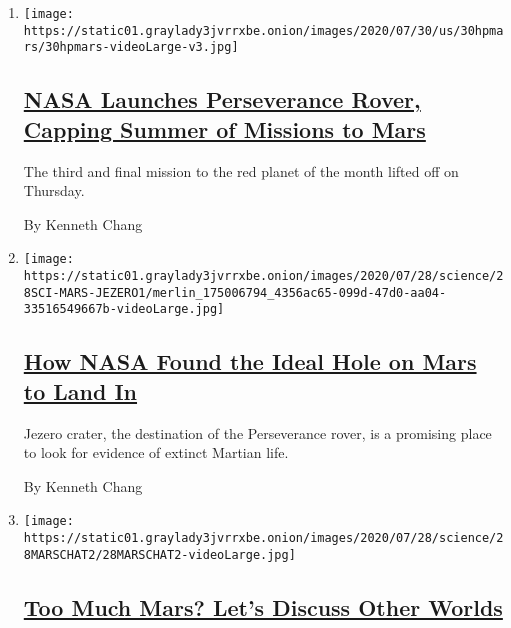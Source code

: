 \begin{enumerate}
\def\labelenumi{\arabic{enumi}.}
\item
  \texttt{[image: https://static01.graylady3jvrrxbe.onion/images/2020/07/30/us/30hpmars/30hpmars-videoLarge-v3.jpg]}

  \hypertarget{nasa-launches-perseverance-rover-capping-summer-of-missions-to-mars}{%
  \subsection{\texorpdfstring{\href{/2020/07/30/science/nasa-mars-launch.html}{NASA
  Launches Perseverance Rover, Capping Summer of Missions to
  Mars}}{NASA Launches Perseverance Rover, Capping Summer of Missions to Mars}}\label{nasa-launches-perseverance-rover-capping-summer-of-missions-to-mars}}

  The third and final mission to the red planet of the month lifted off
  on Thursday.

  By Kenneth Chang
\item
  \texttt{[image: https://static01.graylady3jvrrxbe.onion/images/2020/07/28/science/28SCI-MARS-JEZERO1/merlin\_175006794\_4356ac65-099d-47d0-aa04-33516549667b-videoLarge.jpg]}

  \hypertarget{how-nasa-found-the-ideal-hole-on-mars-to-land-in}{%
  \subsection{\texorpdfstring{\href{/2020/07/28/science/nasa-jezero-perseverance.html}{How
  NASA Found the Ideal Hole on Mars to Land
  In}}{How NASA Found the Ideal Hole on Mars to Land In}}\label{how-nasa-found-the-ideal-hole-on-mars-to-land-in}}

  Jezero crater, the destination of the Perseverance rover, is a
  promising place to look for evidence of extinct Martian life.

  By Kenneth Chang
\item
  \texttt{[image: https://static01.graylady3jvrrxbe.onion/images/2020/07/28/science/28MARSCHAT2/28MARSCHAT2-videoLarge.jpg]}

  \hypertarget{too-much-mars-lets-discuss-other-worlds}{%
  \subsection{\texorpdfstring{\href{/2020/07/28/science/mars-nasa-science.html}{Too
  Much Mars? Let's Discuss Other
  Worlds}}{Too Much Mars? Let's Discuss Other Worlds}}\label{too-much-mars-lets-discuss-other-worlds}}


\end{enumerate}
